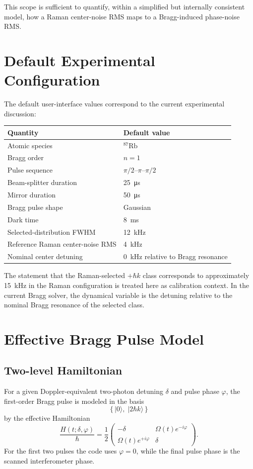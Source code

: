 \documentclass[11pt]{article}
\begin{document}
This scope is sufficient to quantify, within a simplified but internally consistent model, how a Raman center-noise RMS maps to a Bragg-induced phase-noise RMS.

\section{Default Experimental Configuration}
The default user-interface values correspond to the current experimental discussion:
\begin{center}
\begin{tabular}{ll}
\toprule
Quantity & Default value \\
\midrule
Atomic species & ${}^{87}\mathrm{Rb}$ \\
Bragg order & $n=1$ \\
Pulse sequence & $\pi/2$--$\pi$--$\pi/2$ \\
Beam-splitter duration & \SI{25}{\micro\second} \\
Mirror duration & \SI{50}{\micro\second} \\
Bragg pulse shape & Gaussian \\
Dark time & \SI{8}{\milli\second} \\
Selected-distribution FWHM & \SI{12}{\kilo\hertz} \\
Reference Raman center-noise RMS & \SI{4}{\kilo\hertz} \\
Nominal center detuning & \SI{0}{\kilo\hertz} relative to Bragg resonance \\
\bottomrule
\end{tabular}
\end{center}

The statement that the Raman-selected $+\hbar k$ class corresponds to approximately \SI{15}{\kilo\hertz} in the Raman configuration is treated here as calibration context. In the current Bragg solver, the dynamical variable is the detuning relative to the nominal Bragg resonance of the selected class.

\section{Effective Bragg Pulse Model}
\subsection{Two-level Hamiltonian}
For a given Doppler-equivalent two-photon detuning $\delta$ and pulse phase $\varphi$, the first-order Bragg pulse is modeled in the basis
\[
\bigl\{\, |0\rangle,\; |2\hbar k\rangle \,\bigr\}
\]
by the effective Hamiltonian
\begin{equation}
\frac{H(t;\delta,\varphi)}{\hbar}
=
\frac{1}{2}
\begin{pmatrix}
-\delta & \Omega(t)e^{-i\varphi} \\
\Omega(t)e^{+i\varphi} & \delta
\end{pmatrix}.
\label{eq:effective_hamiltonian}
\end{equation}
For the first two pulses the code uses $\varphi=0$, while the final pulse phase is the scanned interferometer phase.
\end{document}
